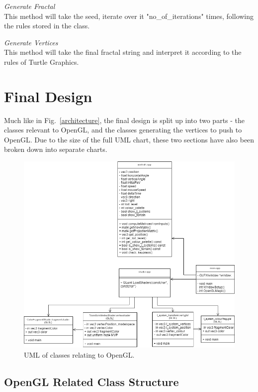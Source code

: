 \documentclass[a4paper,10pt]{report}
\begin{document}
\textit{Generate Fractal}\\

This method will take the seed, iterate over it  "no\_of\_iterations" times, following the rules stored in the class.

\textit{Generate Vertices}\\

This method will take the final fractal string and interpret it according to the rules of Turtle Graphics.

\clearpage

\section{Final Design}

Much like in Fig.~\ref{architecture}, the final design is split up into two parts - the classes relevant to OpenGL, and the classes generating the vertices to push to OpenGL. Due to the size of the full UML chart, these two sections have also been broken down into separate charts.

\begin{figure}[h!]
\centering
  \includegraphics[width=1\textwidth]{Images/Charts/OpenGL_UML.png}
 \caption{UML of classes relating to OpenGL.}
 \label{fig:opengl_uml}
\end{figure}


\subsection{OpenGL Related Class Structure}
\end{document}
